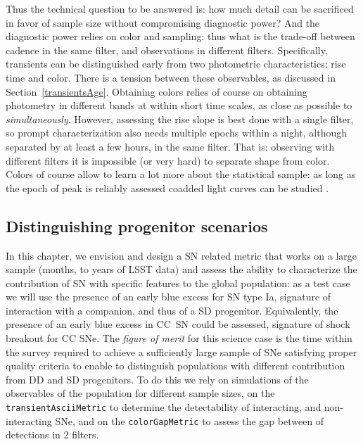 Thus the technical question to be answered is: how much detail can be
sacrificed in favor of sample size without compromising diagnostic
power? And the diagnostic power relies on color and sampling: thus
what is the trade-off between cadence in the same filter, and
observations in different filters. Specifically, transients can be
distinguished early from two photometric characteristics: rise time
and color. There is a tension between these observables, as discussed
in Section~\ref{transientsAge}. Obtaining colors relies of course on
obtaining photometry in different bands at within short time scales,
as close as possible to \emph{simultaneously}. However, assessing the
rise slope is best done with a single filter, so prompt
characterization also needs multiple epochs within a night, although
separated by at least a few hours, in the same filter. That is:
observing with different filters it is impossible (or very hard) to
separate shape from color. Colors of course allow to learn a lot more
about the statistical sample: as long as the epoch of peak is reliably
assessed coadded light curves can be studied \citep{Bianco11}.

\subsection{Distinguishing progenitor scenarios}

In this chapter, we envision and design a SN related metric that works
on a large sample (months, to years of LSST data) and assess the
ability to characterize the contribution of SN with specific features
to the global population: as a test case we will use the presence of
an early blue excess for SN type Ia, signature of interaction with a
companion, and thus of a SD progenitor. Equivalently, the presence of
an early blue excess in CC~SN could be assessed, signature of shock
breakout for CC SNe. The \emph{figure of merit} for this science case
is the time within the survey required to achieve a sufficiently large
sample of SNe satisfying proper quality criteria to enable to
distinguish populations with different contribution from DD and SD
progenitors.  To do this we rely on simulations of the observables of
the population for different sample sizes, on the
\texttt{transientAsciiMetric} to determine the detectability of
interacting, and non-interacting SNe, and on the
\texttt{colorGapMetric} to assess the gap between of detections in 2
filters.

